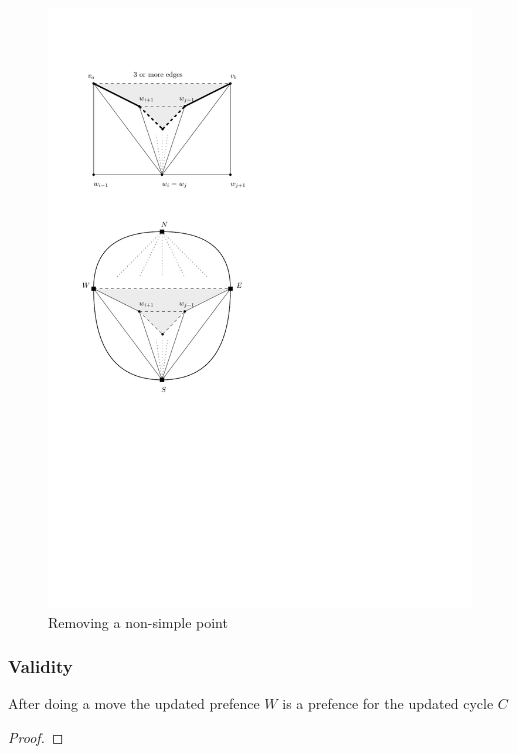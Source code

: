 \begin{figure}[h!]
\centering
\includegraphics[scale=1]{redAlgo/img/removeNonSimplePoint}

\caption{Removing a non-simple point
    \label{fig:removeNonSimplePoint}}
\end{figure}

\subsubsection{Validity}
\label{ss:validity}

\begin{lemma}
After doing a move the updated prefence $W$ is a prefence for the updated cycle $C$
\end{lemma}
\begin{proof}
\end{proof}

